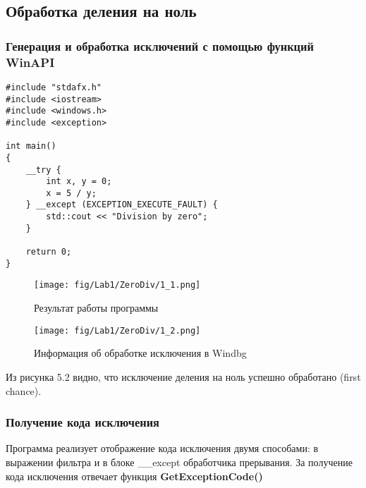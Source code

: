 \subsection{Обработка деления на ноль}
\subsubsection{Генерация и обработка исключений с помощью функций WinAPI}

\begin{lstlisting}[caption=Генерация и обработка исключения]
#include "stdafx.h"
#include <iostream>
#include <windows.h>
#include <exception>

int main()
{
    __try {
        int x, y = 0;
        x = 5 / y;
    } __except (EXCEPTION_EXECUTE_FAULT) {
        std::cout << "Division by zero";
    }

    return 0;
}
\end{lstlisting}

\begin{figure}[H]
    \begin{center}
        \texttt{[image: fig/Lab1/ZeroDiv/1\_1.png]}
        \caption{Результат работы программы}
        \label{pic:1_1}
    \end{center}
\end{figure}

\begin{figure}[H]
    \begin{center}
        \texttt{[image: fig/Lab1/ZeroDiv/1\_2.png]}
        \caption{Информация об обработке исключения в Windbg}
        \label{pic:1_2}
    \end{center}
\end{figure}

Из рисунка 5.2 видно, что исключение деления на ноль успешно обработано (first chance).

\subsubsection{Получение кода исключения}
Программа реализует отображение кода исключения двумя способами: в выражении фильтра и в блоке \_\_except обработчика прерывания.
За получение кода исключения отвечает функция \textbf{GetExceptionCode()}

